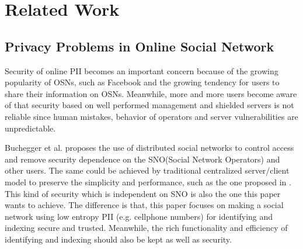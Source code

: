 \documentclass[10pt, conference, compsocconf]{IEEEtran}
\begin{document}


\section{Related Work}  \label{sec_rw}
    \subsection{Privacy Problems in Online Social Network}
    Security of online PII becomes an important concern \cite{lzf1, lzf2} because
    of the growing popularity of OSNs, such as Facebook and
    the growing tendency for users to share their information
    on OSNs.
    Meanwhile, more and more users
    become aware of that security based on well performed
    management and shielded
    servers is not reliable since human mistakes, behavior of operators and server
    vulnerabilities are unpredictable.

    Buchegger et al.\cite{lzf3, lzf4} proposes the use of distributed social networks
    to control access and
    remove security dependence on the SNO(Social Network Operators) and other users.
    The same could be achieved by traditional centralized server/client model
    to preserve the simplicity and performance, such as the one proposed in \cite{lzf5}.
    This kind of security which is independent on SNO is also the one 
    this paper wants to achieve.
    The difference is that, this paper focuses on making a social network using low entropy PII
    (e.g. cellphone numbers) for identifying and indexing secure and trusted. 
    Meanwhile, the rich functionality and efficiency of identifying and indexing 
    should also be kept as well as security.
\end{document}
